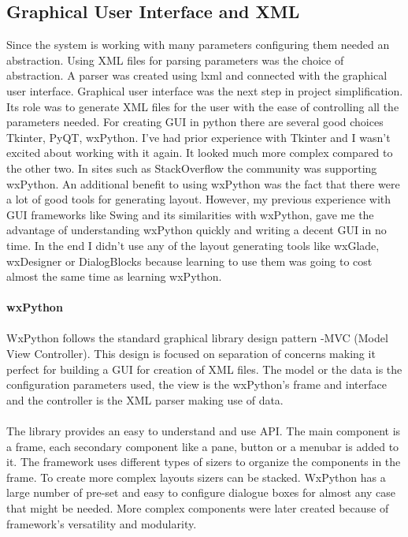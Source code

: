 \subsection{Graphical User Interface and XML}
Since the system is working with many parameters configuring them needed an abstraction. Using XML files for parsing parameters was the choice of abstraction. A parser was created
using lxml\cite{lxml} and connected with the graphical user interface.
Graphical user interface was the next step in project simplification. Its role was to generate XML files for the user with the ease of controlling all the parameters needed.
For creating GUI in python there are several good choices Tkinter, PyQT, wxPython. I've had prior experience with Tkinter and I wasn't excited about working with it again. It looked
much more complex compared to the other two. In sites such as StackOverflow the community was supporting wxPython. An additional benefit to using wxPython was the fact that there were a
lot of good tools for generating layout. However, my previous experience with GUI frameworks like Swing and its similarities with wxPython, gave me the advantage of understanding wxPython
quickly and writing a decent GUI in no time. In the end I didn't use any of the layout generating tools like wxGlade, wxDesigner or DialogBlocks because learning to use them was going to
cost almost the same time as learning wxPython.
\paragraph{}
\textbf{wxPython}
\paragraph{}
WxPython follows the standard graphical library design pattern -MVC (Model View Controller).
This design is focused on separation of concerns making it perfect for building a GUI for creation of XML files. The model or the 
data is the configuration parameters used, the view is the wxPython's frame and interface and the controller is the XML parser making use of data.
\paragraph{}
The library provides an easy to understand and use API. The main component is a frame, each secondary component like a pane, button or a menubar
is added to it. The framework uses different types of sizers to organize the components in the frame. To create more complex layouts
sizers can be stacked. WxPython has a large number of pre-set and easy to configure dialogue boxes for almost any case that might be needed.
More complex components were later created because of framework's versatility and modularity.